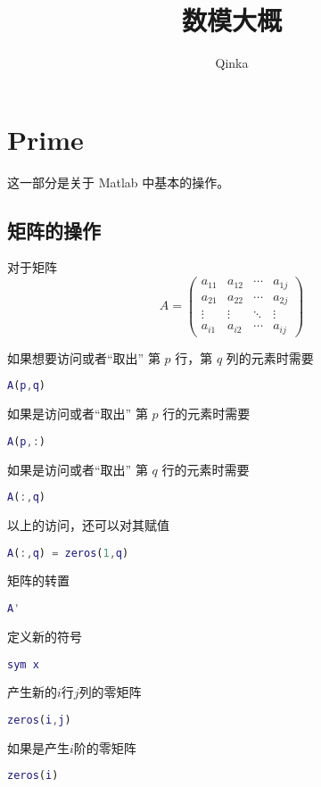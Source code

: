 \documentclass{ctexart}
\author{Qinka}
\title{数模大概}
\begin{document}
  \maketitle
  \section{Prime}
  \label{sec:prime}
  这一部分是关于 Matlab 中基本的操作。

  \subsection{矩阵的操作}
  \label{ssec:mat:base}
  对于矩阵
  $$A=\left(\begin{array}{cccc}
  a_{11} & a_{12} & \cdots & a_{1j} \\
  a_{21} & a_{22} & \cdots & a_{2j} \\
  \vdots & \vdots & \ddots & \vdots \\
  a_{i1} & a_{i2} & \cdots & a_{ij}
  \end{array}\right)$$

  如果想要访问或者“取出” 第 $p$ 行，第 $q$ 列的元素时需要
  \begin{lstlisting}[language=matlab]
    A(p,q)
  \end{lstlisting}

  如果是访问或者“取出” 第 $p$ 行的元素时需要
  \begin{lstlisting}[language=matlab]
    A(p,:)
  \end{lstlisting}

  如果是访问或者“取出” 第 $q$ 行的元素时需要
  \begin{lstlisting}[language=matlab]
    A(:,q)
  \end{lstlisting}

  以上的访问，还可以对其赋值
  \begin{lstlisting}[language=matlab]
    A(:,q) = zeros(1,q)
  \end{lstlisting}

  矩阵的转置
  \begin{lstlisting}[language=matlab]
  A'
  \end{lstlisting}

  定义新的符号
  \begin{lstlisting}[language=matlab]
    sym x
  \end{lstlisting}

  产生新的$i$行$j$列的零矩阵
  \begin{lstlisting}[language=matlab]
    zeros(i,j)
  \end{lstlisting}
  如果是产生$i$阶的零矩阵
  \begin{lstlisting}[language=matlab]
    zeros(i)
  \end{lstlisting}
\end{document}
